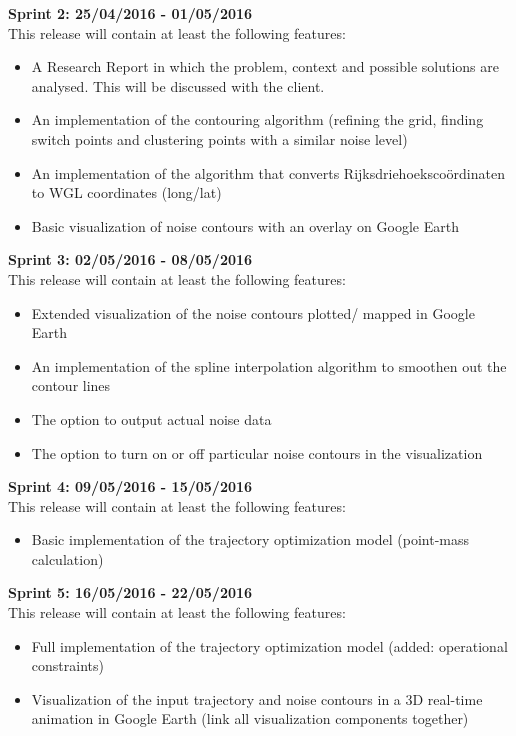 \textbf{Sprint 2: 25/04/2016 - 01/05/2016 } \\
This release will contain at least the following features:
\begin{itemize}
\item A Research Report in which the problem, context and possible solutions are analysed. This will be discussed with the client.
\item An implementation of the contouring algorithm (refining the grid, finding switch points and clustering points with a similar noise level)
\item An implementation of the algorithm that converts Rijksdriehoekscoördinaten to WGL coordinates (long/lat)
\item Basic visualization of noise contours with an overlay on Google Earth
\end{itemize}

\textbf{Sprint 3: 02/05/2016 - 08/05/2016} \\
This release will contain at least the following features:
\begin{itemize}
\item Extended visualization of the noise contours plotted/ mapped in Google Earth
\item An implementation of the spline interpolation algorithm to smoothen out the contour lines
\item The option to output actual noise data
\item The option to turn on or off particular noise contours in the visualization
\end{itemize}

\textbf{Sprint 4: 09/05/2016 - 15/05/2016} \\
This release will contain at least the following features:
\begin{itemize}
\item Basic implementation of the trajectory optimization model (point-mass calculation)
\end{itemize}

\textbf{Sprint 5: 16/05/2016 - 22/05/2016} \\
This release will contain at least the following features:
\begin{itemize}
\item Full implementation of the trajectory optimization model (added: operational constraints)
\item Visualization of the input trajectory and noise contours in a 3D real-time animation in Google Earth (link all visualization components together)
\end{itemize}

